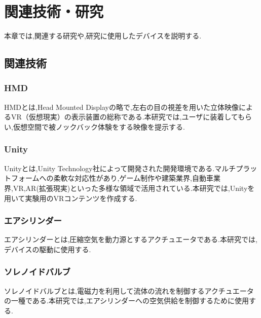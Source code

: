 \chapter{関連技術・研究}

\begin{comment}
\begin{textblock}{6}(14.5, 22)
  ←図のキャプションは図の下
\end{textblock}
\end{comment}

本章では,関連する研究や,研究に使用したデバイスを説明する.

\section{関連技術}

\subsection{HMD}

HMDとは,Head Mounted Displayの略で,左右の目の視差を用いた立体映像によるVR（仮想現実）の表示装置の総称である.本研究では,ユーザに装着してもらい,仮想空間で被ノックバック体験をする映像を提示する.


\subsection{Unity}

Unityとは,Unity Technology社によって開発された開発環境である.マルチプラットフォームへの柔軟な対応性があり,ゲーム制作や建築業界,自動車業界,VR,AR(拡張現実)といった多様な領域で活用されている.本研究では,Unityを用いて実験用のVRコンテンツを作成する.

\subsection{エアシリンダー}

エアシリンダーとは,圧縮空気を動力源とするアクチュエータである.本研究では,デバイスの駆動に使用する.

\subsection{ソレノイドバルブ}

ソレノイドバルブとは,電磁力を利用して流体の流れを制御するアクチュエータの一種である.本研究では,エアシリンダーへの空気供給を制御するために使用する.

